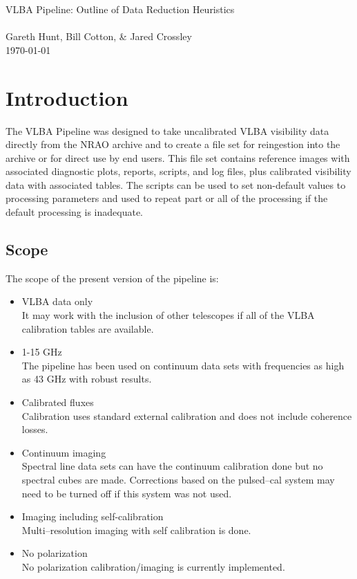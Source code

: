 \documentclass[11pt]{article}
\begin{document}
{
\begin{center}
{\Large VLBA Pipeline: Outline of Data Reduction Heuristics} \\
~ \\
Gareth Hunt, Bill Cotton, \& Jared Crossley \\
\today
\end{center}}

\section{Introduction}

The VLBA Pipeline was designed to take uncalibrated VLBA visibility data
directly from the NRAO archive and to create a file set for
reingestion into the archive or for direct use by end users.
This file set contains reference images with associated diagnostic
plots, reports, scripts, and log files, plus calibrated visibility data
with associated tables.
The scripts can be used to set non-default values to processing
parameters and used to repeat part or all of the processing if the
default processing is inadequate.


\subsection{Scope}

The scope of the present version of the pipeline is:

\begin{itemize}
\item VLBA data only\\
It may work with the inclusion of other telescopes if all of the VLBA
calibration tables are available.
\item 1-15 GHz\\
The pipeline has been used on continuum data sets with frequencies as
high as 43 GHz with robust results.
\item Calibrated fluxes\\
Calibration uses standard external calibration and does not include
coherence losses.
\item Continuum imaging\\
Spectral line data sets can have the continuum calibration done but
no spectral cubes are made.
Corrections based on the pulsed--cal system may need to be turned off
if this system was not used.
\item Imaging including self-calibration\\
Multi--resolution imaging with self calibration is done.
\item No polarization \\
No polarization calibration/imaging is currently implemented.
\end{itemize}
\end{document}
